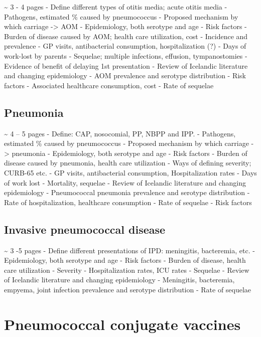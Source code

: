 \documentclass[]{book}
\theoremstyle{definition}
\theoremstyle{definition}
\theoremstyle{definition}
\theoremstyle{remark}
\begin{document}
\textasciitilde{} 3 - 4 pages - Define different types of otitis media;
acute otitis media - Pathogens, estimated \% caused by pneumococcus -
Proposed mechanism by which carriage -\textgreater{} AOM - Epidemiology,
both serotype and age - Risk factors - Burden of disease caused by AOM;
health care utilization, cost - Incidence and prevalence - GP visits,
antibacterial consumption, hospitalization (?) - Days of work-lost by
parents - Sequelae; multiple infections, effusion, tympanostomies -
Evidence of benefit of delaying 1st presentation - Review of Icelandic
literature and changing epidemiology - AOM prevalence and serotype
distribution - Risk factors - Associated healthcare consumption, cost -
Rate of sequelae

\subsection{Pneumonia}\label{pneumonia}

\textasciitilde{} 4 -- 5 pages - Define: CAP, nosocomial, PP, NBPP and
IPP. - Pathogens, estimated \% caused by pneumococcus - Proposed
mechanism by which carriage -\textgreater{} pneumonia - Epidemiology,
both serotype and age - Risk factors - Burden of disease caused by
pneumonia, health care utilization - Ways of defining severity; CURB-65
etc. - GP visits, antibacterial consumption, Hospitalization rates -
Days of work lost - Mortality, sequelae - Review of Icelandic literature
and changing epidemiology - Pneumococcal pneumonia prevalence and
serotype distribution - Rate of hospitalization, healthcare consumption
- Rate of sequelae - Risk factors

\subsection{Invasive pneumococcal
disease}\label{invasive-pneumococcal-disease}

\textasciitilde{} 3 -5 pages - Define different presentations of IPD:
meningitis, bacteremia, etc. - Epidemiology, both serotype and age -
Risk factors - Burden of disease, health care utilization - Severity -
Hospitalization rates, ICU rates - Sequelae - Review of Icelandic
literature and changing epidemiology - Meningitis, bacteremia, empyema,
joint infection prevalence and serotype distribution - Rate of sequelae

\section{Pneumococcal conjugate
vaccines}\label{pneumococcal-conjugate-vaccines}
\end{document}
